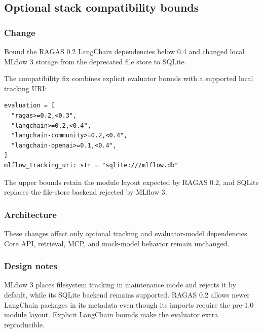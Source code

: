 
\subsection{Optional stack compatibility bounds}


\subsubsection{Change}

Bound the RAGAS 0.2 LangChain dependencies below 0.4 and changed local MLflow 3 storage from the deprecated file store to SQLite.

The compatibility fix combines explicit evaluator bounds with a supported local tracking URI:

\begin{verbatim}
evaluation = [
  "ragas>=0.2,<0.3",
  "langchain>=0.2,<0.4",
  "langchain-community>=0.2,<0.4",
  "langchain-openai>=0.1,<0.4",
]
mlflow_tracking_uri: str = "sqlite:///mlflow.db"
\end{verbatim}

The upper bounds retain the module layout expected by RAGAS 0.2, and SQLite replaces the file-store backend rejected by MLflow 3.

\subsubsection{Architecture}

These changes affect only optional tracking and evaluator-model dependencies. Core API, retrieval, MCP, and mock-model behavior remain unchanged.

\subsubsection{Design notes}

MLflow 3 places filesystem tracking in maintenance mode and rejects it by default, while its SQLite backend remains supported. RAGAS 0.2 allows newer LangChain packages in its metadata even though its imports require the pre-1.0 module layout. Explicit LangChain bounds make the evaluator extra reproducible.

